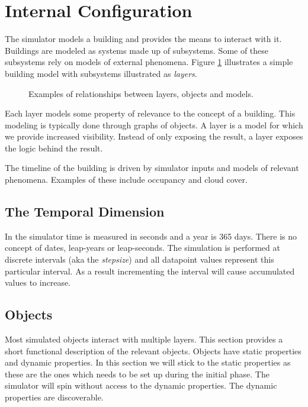 \documentclass[10pt]{article}
\newcommand{\includeSVG}[1]{
  \texttt{[image: figs/\#1.pdf]}
}
\begin{document}
\section{Internal Configuration}
\label{sec:internals}

The simulator models a building and provides the means to interact with it. Buildings are modeled as systems made up of subsystems. Some of these subsystems rely on models of external phenomena. Figure \ref{fig:layers} illustrates a simple building model with subsystems illustrated as \textsl{layers}.

\begin{figure}[htb]
  \begin{center}
    \rotatebox{0}{\scalebox{0.4}{\includeSVG{layers}}}
  \end{center}
  \caption{Examples of relationships between layers, objects and models.}
  \label{fig:layers}
\end{figure}

Each layer models some property of relevance to the concept of a building. This modeling is typically done through graphs of objects. A layer is a model for which we provide increased visibility. Instead of only exposing the result, a layer exposes the logic behind the result.


The timeline of the building is driven by simulator inputs and models of relevant phenomena. Examples of these include occupancy and cloud cover.

\subsection{The Temporal Dimension}

In the simulator time is measured in seconds and a year is 365 days. There is no concept of dates, leap-years or leap-seconds. The simulation is performed at discrete intervals (aka the \textsl{stepsize}) and all datapoint values represent this particular interval. As a result incrementing the interval will cause accumulated values to increase.

\subsection{Objects}

Most simulated objects interact with multiple layers. This section provides a short functional description of the relevant objects. Objects have static properties and dynamic properties. In this section we will stick to the static properties as these are the ones which needs to be set up during the initial phase. The simulator will spin without access to the dynamic properties. The dynamic properties are discoverable.
\end{document}
